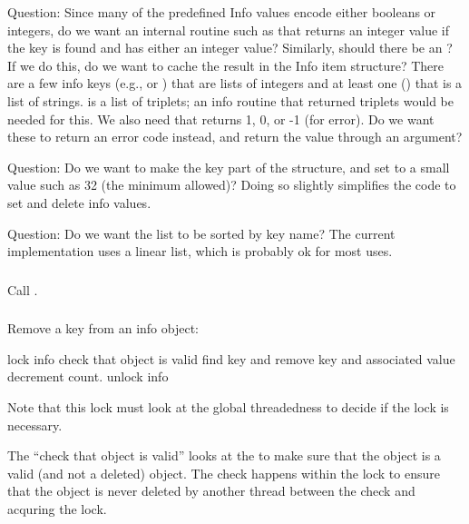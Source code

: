 \documentclass{article}
\begin{document}
Question: Since many of the predefined Info values encode either booleans or
integers, do we want an internal routine such as 
that returns an integer value if the key is found and has either an integer
value?  Similarly, should there be an ?
If we do this, do we want to cache the result in the Info item
structure?
There are a few info keys (e.g.,  or
) that are lists of integers and at least one
() that is a list of strings.  
is a list of triplets; an info routine that returned triplets would be
needed for this.
We also need  that returns 1, 0, or -1
(for error).  
Do we want these to return an error code instead, and return the value
through an argument?

Question: Do we want to make the key part of the structure, and set
 to a small value such as 32 (the minimum
allowed)?  Doing so slightly simplifies the code to set and delete info
values. 

Question: Do we want the list to be sorted by key name?  The current
implementation uses a linear list, which is probably ok for most uses.

\subsubsection{}
Call .

\subsubsection{}
Remove a key from an info object:
\begin{algorithm}
lock info
check that object is valid
find key and remove key and associated value
decrement count.
unlock info
\end{algorithm}
Note that this lock must look at the global threadedness to decide if
the lock is necessary.  

The ``check that object is valid'' looks at the
 to make sure that the object is a valid (and
not a deleted)  object.  The check happens within
the lock to ensure that the object is never deleted by another thread
between the check and acquring the lock.
\end{document}
